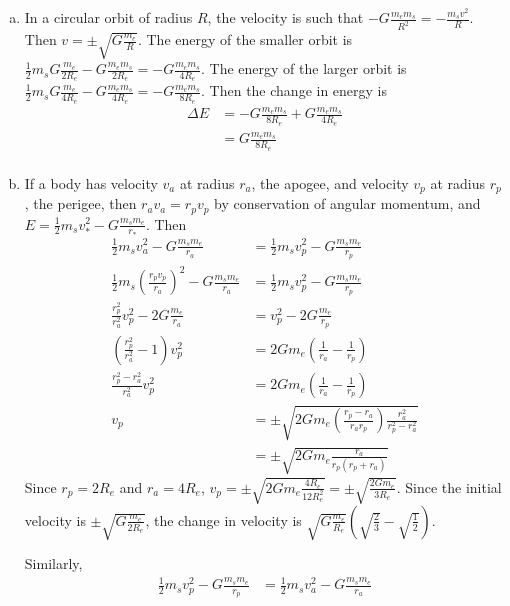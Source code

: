 \documentclass{esg8012pset}
\begin{document}
\begin{solution}
\begin{enumerate}[(a)]
  \item In a circular orbit of radius $R$, the velocity is such that $-G\frac{m_e m_s}{R^2} = -\frac{m_s v^2}{R}$.  Then $v = \pm \sqrt{G\frac{m_e}{R}}$.  The energy of the smaller orbit is $\frac{1}{2} m_s G\frac{m_e}{2R_e} - G\frac{m_e m_s}{2R_e} = -G\frac{m_e m_s}{4R_e}$.  The energy of the larger orbit is $\frac{1}{2} m_s G\frac{m_e}{4R_e} - G\frac{m_e m_s}{4R_e} = -G\frac{m_e m_s}{8R_e}$.  Then the change in energy is \begin{align*}
 \Delta E & = -G\frac{m_e m_s}{8R_e} + G\frac{m_e m_s}{4R_e} \\
 & = G\frac{m_e m_s}{8R_e} \\
\end{align*}
  \item If a body has velocity $v_a$ at radius $r_a$, the apogee, and velocity $v_p$ at radius $r_p$, the perigee, then $r_a v_a = r_p v_p$ by conservation of angular momentum, and $E = \frac{1}{2} m_s v_*^2 - G\frac{m_s m_e}{r_*}$.  Then \begin{align*}
 \frac{1}{2} m_s v_a^2 - G\frac{m_s m_e}{r_a} & = \frac{1}{2} m_s v_p^2 - G\frac{m_s m_e}{r_p} \\
 \frac{1}{2} m_s \left(\frac{r_p v_p}{r_a}\right)^2 - G\frac{m_s m_e}{r_a} & = \frac{1}{2} m_s v_p^2 - G\frac{m_s m_e}{r_p} \\
 \frac{r_p^2}{r_a^2} v_p^2 - 2G\frac{m_e}{r_a} & = v_p^2 - 2G\frac{m_e}{r_p} \\
 \left(\frac{r_p^2}{r_a^2} - 1\right) v_p^2 & = 2Gm_e\left(\frac{1}{r_a} - \frac{1}{r_p}\right) \\
 \frac{r_p^2 - r_a^2}{r_a^2} v_p^2  & = 2Gm_e\left(\frac{1}{r_a} - \frac{1}{r_p}\right) \\
 v_p  & = \pm\sqrt{2Gm_e\left(\frac{r_p - r_a}{r_a r_p}\right)\frac{r_a^2}{r_p^2 - r_a^2}} \\
   & = \pm\sqrt{2Gm_e\frac{r_a}{r_p(r_p + r_a)}}
\end{align*}  Since $r_p = 2R_e$ and $r_a = 4R_e$, $v_p = \pm\sqrt{2Gm_e\frac{4R_e}{12R_e^2}} = \pm\sqrt{\frac{2G m_e}{3R_e}}$.  Since the initial velocity is $\pm \sqrt{G\frac{m_e}{2R_e}}$, the change in velocity is $\sqrt{G\frac{m_e}{R_e}}\left(\sqrt{\frac{2}{3}} - \sqrt{\frac{1}{2}}\right)$. \par
Similarly, \begin{align*}
 \frac{1}{2} m_s v_p^2 - G\frac{m_s m_e}{r_p} & = \frac{1}{2} m_s v_a^2 - G\frac{m_s m_e}{r_a} \\

\end{align*}
\end{enumerate}
\end{solution}
\end{document}
